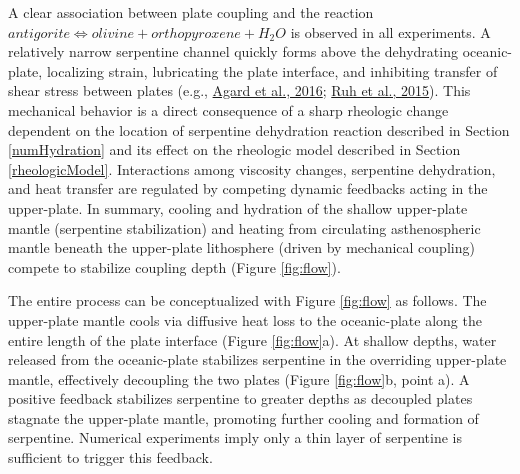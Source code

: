 A clear association between plate coupling and the reaction \(antigorite \allowbreak \Leftrightarrow olivine + orthopyroxene + H_{2}O\) is observed in all experiments. A relatively narrow serpentine channel quickly forms above the dehydrating oceanic-plate, localizing strain, lubricating the plate interface, and inhibiting transfer of shear stress between plates (e.g., \protect\hyperlink{ref-agard2016}{Agard et al., 2016}; \protect\hyperlink{ref-ruh2015}{Ruh et al., 2015}). This mechanical behavior is a direct consequence of a sharp rheologic change dependent on the location of serpentine dehydration reaction described in Section \ref{numHydration} and its effect on the rheologic model described in Section \ref{rheologicModel}. Interactions among viscosity changes, serpentine dehydration, and heat transfer are regulated by competing dynamic feedbacks acting in the upper-plate. In summary, cooling and hydration of the shallow upper-plate mantle (serpentine stabilization) and heating from circulating asthenospheric mantle beneath the upper-plate lithosphere (driven by mechanical coupling) compete to stabilize coupling depth (Figure \ref{fig:flow}).

The entire process can be conceptualized with Figure \ref{fig:flow} as follows. The upper-plate mantle cools via diffusive heat loss to the oceanic-plate along the entire length of the plate interface (Figure \ref{fig:flow}a). At shallow depths, water released from the oceanic-plate stabilizes serpentine in the overriding upper-plate mantle, effectively decoupling the two plates (Figure \ref{fig:flow}b, point a). A positive feedback stabilizes serpentine to greater depths as decoupled plates stagnate the upper-plate mantle, promoting further cooling and formation of serpentine. Numerical experiments imply only a thin layer of serpentine is sufficient to trigger this feedback.

